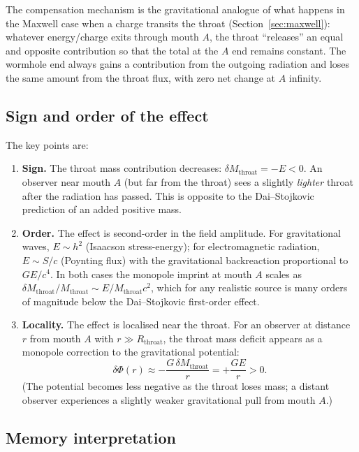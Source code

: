 \documentclass[aps,prd,onecolumn,nofootinbib,superscriptaddress]{revtex4-2}
\begin{document}
The compensation mechanism is the gravitational analogue of what happens in the
Maxwell case when a charge transits the throat (Section~\ref{sec:maxwell}):
whatever energy/charge exits through mouth $A$, the throat ``releases'' an
equal and opposite contribution so that the total at the $A$ end remains
constant.  The wormhole end always gains a contribution from the outgoing
radiation and loses the same amount from the throat flux, with zero net change
at $A$ infinity.

\subsection{Sign and order of the effect}

The key points are:

\begin{enumerate}
\item \textbf{Sign.} The throat mass contribution decreases: $\delta
M_{\mathrm{throat}} = -E < 0$.  An observer near mouth $A$ (but far from the
throat) sees a slightly \emph{lighter} throat after the radiation has passed.
This is opposite to the Dai--Stojkovic prediction of an added positive mass.

\item \textbf{Order.} The effect is second-order in the field amplitude.  For
gravitational waves, $E\sim h^2$ (Isaacson stress-energy); for electromagnetic
radiation, $E\sim S/c$ (Poynting flux) with the gravitational backreaction
proportional to $GE/c^4$.  In both cases the monopole imprint at mouth $A$
scales as $\delta M_{\mathrm{throat}}/M_{\mathrm{throat}} \sim E/M_{\mathrm{throat}} c^2$,
which for any realistic source is many orders of magnitude below the
Dai--Stojkovic first-order effect.

\item \textbf{Locality.}  The effect is localised near the throat.  For an
observer at distance $r$ from mouth $A$ with $r\gg R_{\mathrm{throat}}$, the
throat mass deficit appears as a monopole correction to the gravitational
potential:
\begin{equation}
  \delta\Phi(r) \approx -\frac{G\,\delta M_{\mathrm{throat}}}{r}
  = +\frac{G E}{r} > 0.
\end{equation}
(The potential becomes less negative as the throat loses mass; a distant observer
experiences a slightly weaker gravitational pull from mouth $A$.)
\end{enumerate}

\subsection{Memory interpretation}
\end{document}
